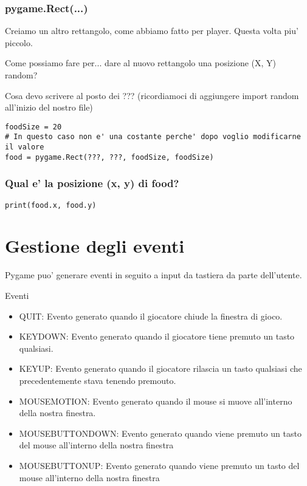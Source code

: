 \documentclass{beamer}
\begin{document}
\begin{frame}[fragile]
    \frametitle{pygame.Rect(...)}
    Creiamo un altro rettangolo, come abbiamo fatto per player. Questa volta piu' piccolo.
    \begin{block}{Come possiamo fare per...}
dare al nuovo rettangolo una posizione (X, Y) random?

Cosa devo scrivere al posto dei ??? (ricordiamoci di aggiungere import random all'inizio del nostro file)
    \end{block}
    \begin{lstlisting}
foodSize = 20
# In questo caso non e' una costante perche' dopo voglio modificarne il valore 
food = pygame.Rect(???, ???, foodSize, foodSize)
    \end{lstlisting}
\end{frame}

\begin{frame}[fragile]
    \frametitle{Qual e' la posizione (x, y) di food?}

    \begin{lstlisting}
print(food.x, food.y)
    \end{lstlisting}
\end{frame}

\section{Gestione degli eventi}

\begin{frame}[fragile]
Pygame puo' generare eventi in seguito a input da tastiera da parte dell'utente.

\begin{block}{Eventi}
    \begin{itemize}
        \item QUIT: Evento generato quando il giocatore chiude la finestra di gioco.
        \item KEYDOWN: Evento generato quando il giocatore tiene premuto un tasto qualsiasi.
        \item KEYUP: Evento generato quando il giocatore rilascia un tasto qualsiasi che precedentemente stava tenendo premouto.
        \item MOUSEMOTION: Evento generato quando il mouse si muove all'interno della nostra finestra.
        \item MOUSEBUTTONDOWN: Evento generato quando viene premuto un tasto del mouse all'interno della nostra finestra
        \item MOUSEBUTTONUP: Evento generato quando viene premuto un tasto del mouse all'interno della nostra finestra
    \end{itemize}
\end{block}

\end{frame}
\end{document}
